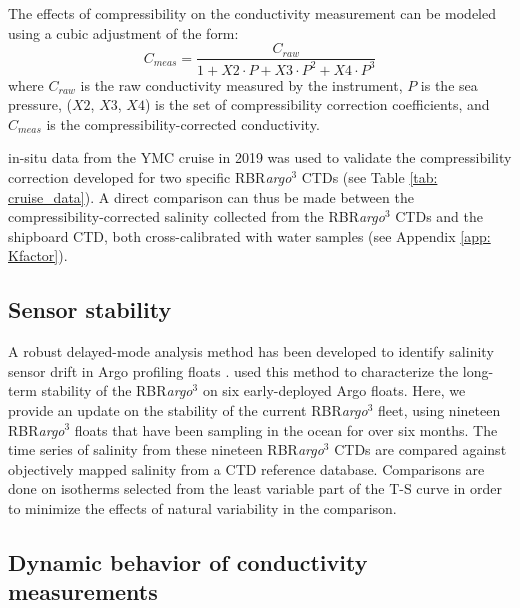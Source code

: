 \documentclass{ametsocV6.1}
\begin{document}
The effects of compressibility on the conductivity measurement can be modeled using a cubic adjustment of the form:
\begin{equation}
	C_{meas} = \frac{C_{raw}}{1 + X2\cdot P + X3\cdot P^2 + X4\cdot P^3}
	\label{eq: pressure_correction}
\end{equation}
where $C_{raw}$ is the raw conductivity measured by the instrument, $P$ is the sea pressure, ($X2$, $X3$, $X4$) is the set of compressibility correction coefficients, and $C_{meas}$ is the compressibility-corrected conductivity.

in-situ data from the YMC cruise in 2019 was used to validate the compressibility correction developed for two specific RBR\textit{argo}$^3$ CTDs (see Table \ref{tab: cruise_data}). 
A direct comparison can thus be made between the compressibility-corrected salinity collected from the RBR\textit{argo}$^3$ CTDs and the shipboard CTD, both cross-calibrated with water samples (see Appendix \ref{app: Kfactor}).

\subsection{Sensor stability}
A robust delayed-mode analysis method has been developed to identify salinity sensor drift in Argo profiling floats \citep{Owens_2009,  Cabanes_2016}. 
\cite{Nezlin_2020} used this method to characterize the long-term stability of the RBR\textit{argo}$^3$ on six early-deployed Argo floats.  
Here, we provide an update on the stability of the current RBR\textit{argo}$^3$ fleet, using nineteen RBR\textit{argo}$^3$ floats that have been sampling in the ocean for over six months. 
The time series of salinity from these nineteen RBR\textit{argo}$^3$ CTDs are compared against objectively mapped salinity from a CTD reference database. Comparisons are done on isotherms selected from the least variable part of the T-S curve in order to minimize the effects of natural variability in the comparison. 

\subsection{Dynamic behavior of conductivity measurements}
\label{sec: dynamic_datasets}
\end{document}
